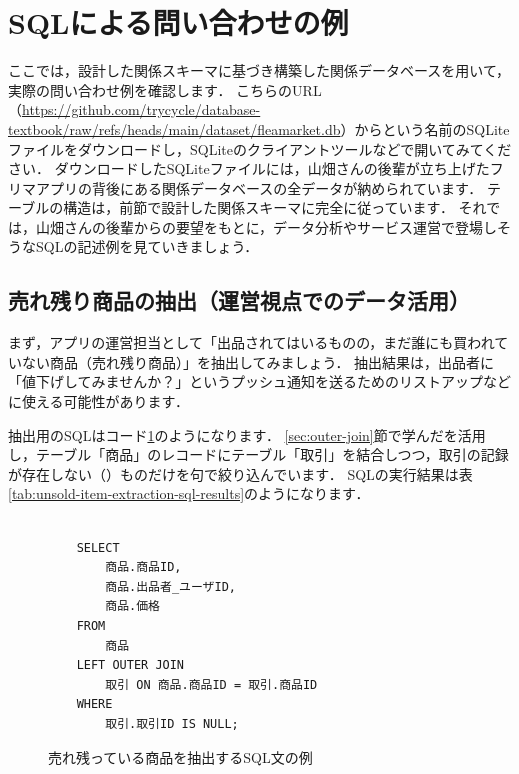 \section{SQLによる問い合わせの例}
ここでは，設計した関係スキーマに基づき構築した関係データベースを用いて，実際の問い合わせ例を確認します．
こちらのURL（\url{https://github.com/trycycle/database-textbook/raw/refs/heads/main/dataset/fleamarket.db}）からという名前のSQLiteファイルをダウンロードし，SQLiteのクライアントツールなどで開いてみてください．
ダウンロードしたSQLiteファイルには，山畑さんの後輩が立ち上げたフリマアプリの背後にある関係データベースの全データが納められています．
テーブルの構造は，前節で設計した関係スキーマに完全に従っています．
それでは，山畑さんの後輩からの要望をもとに，データ分析やサービス運営で登場しそうなSQLの記述例を見ていきましょう．

\subsection{売れ残り商品の抽出（運営視点でのデータ活用）}
まず，アプリの運営担当として「出品されてはいるものの，まだ誰にも買われていない商品（売れ残り商品）」を抽出してみましょう．
抽出結果は，出品者に「値下げしてみませんか？」というプッシュ通知を送るためのリストアップなどに使える可能性があります．

抽出用のSQLはコード\ref{code:unsold-item-extraction-sql}のようになります．
\ref{sec:outer-join}節で学んだを活用し，テーブル「商品」のレコードにテーブル「取引」を結合しつつ，取引の記録が存在しない（）ものだけを句で絞り込んでいます．
SQLの実行結果は表\ref{tab:unsold-item-extraction-sql-results}のようになります．
\begin{figure}[!htbp]
    \begin{verbatim}

    SELECT
        商品.商品ID,
        商品.出品者_ユーザID,
        商品.価格
    FROM
        商品
    LEFT OUTER JOIN
        取引 ON 商品.商品ID = 取引.商品ID
    WHERE
        取引.取引ID IS NULL;

    \end{verbatim}
    \captionsetup{name=コード}
    \caption{売れ残っている商品を抽出するSQL文の例}
    \label{code:unsold-item-extraction-sql}
\end{figure}

